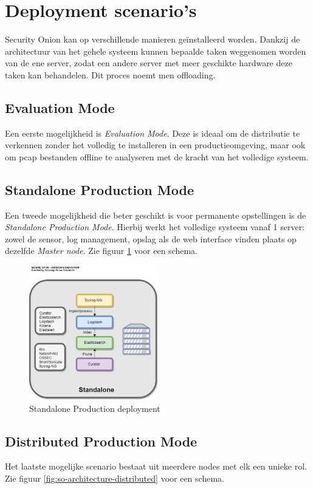 \documentclass[a4paper,12pt]{report}
\begin{document}
\section{Deployment scenario's}
Security Onion kan op verschillende manieren geïnstalleerd worden.
Dankzij de architectuur van het gehele systeem kunnen bepaalde taken weggenomen worden van de ene server, zodat een andere server met meer geschikte hardware deze taken kan behandelen.
Dit proces noemt men offloading.

\subsection{Evaluation Mode}
Een eerste mogelijkheid is \emph{Evaluation Mode}.
Deze is ideaal om de distributie te verkennen zonder het volledig te installeren in een productieomgeving, maar ook om pcap bestanden offline te analyseren met de kracht van het volledige systeem.

\subsection{Standalone Production Mode}
Een tweede mogelijkheid die beter geschikt is voor permanente opstellingen is de \emph{Standalone Production Mode}.
Hierbij werkt het volledige systeem vanaf 1 server: zowel de sensor, log management, opslag als de web interface vinden plaats op dezelfde \emph{Master node}.
Zie figuur \ref{fig:so-architecture-standalone} voor een schema.
\begin{figure}[H]
  \centering
  \includegraphics[width=0.5\textwidth]{so-architecture-production-standalone}
  \caption{Standalone Production deployment \autocite{so:docs}}
  \label{fig:so-architecture-standalone}
\end{figure}

\subsection{Distributed Production Mode}
Het laatste mogelijke scenario bestaat uit meerdere nodes met elk een unieke rol.
Zie figuur \ref{fig:so-architecture-distributed} voor een schema.
\end{document}
